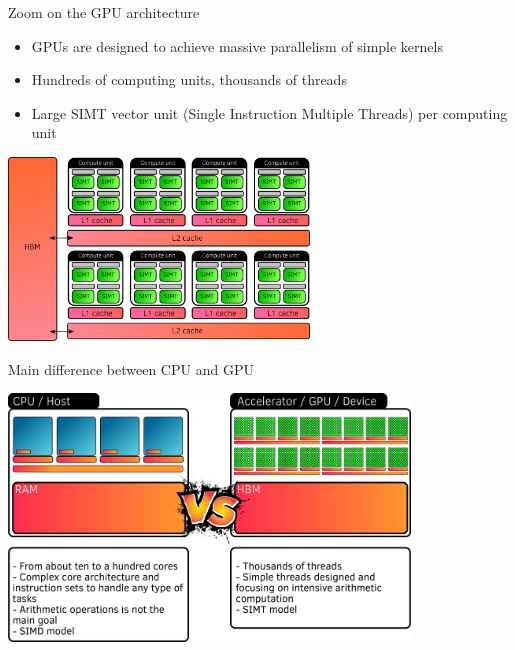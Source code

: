 \documentclass[aspectratio=169]{beamer}
\begin{document}

\begin{frame}{Zoom on the GPU architecture}
    \begin{itemize}
        \item GPUs are designed to achieve massive parallelism of simple kernels
        \item Hundreds of computing units, thousands of threads
        \item Large SIMT vector unit (Single Instruction Multiple Threads) per computing unit
    \end{itemize}
    \begin{center}
        \includegraphics[width=0.6\textwidth]{gpu_architecture.png}
    \end{center}
\end{frame}


\begin{frame}{Main difference between CPU and GPU}
    \begin{center}
        \includegraphics[width=0.8\textwidth]{cpu_vs_gpu.png}
    \end{center}
\end{frame}

\end{document}
